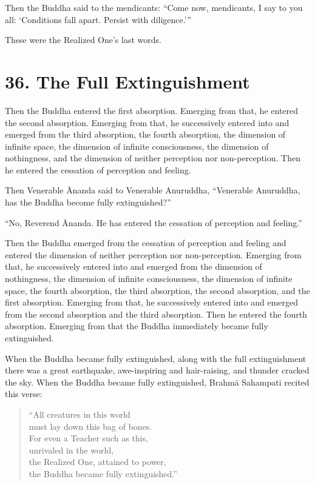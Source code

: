 \documentclass[12pt,openany]{book}%
\begin{document}
Then the Buddha said to the mendicants: “Come now, mendicants, I say to you all: ‘Conditions fall apart. Persist with diligence.’” 

These were the Realized One’s last words. 

\section*{36. The Full Extinguishment }

Then the Buddha entered the first absorption. Emerging from that, he entered the second absorption. Emerging from that, he successively entered into and emerged from the third absorption, the fourth absorption, the dimension of infinite space, the dimension of infinite consciousness, the dimension of nothingness, and the dimension of neither perception nor non-perception. Then he entered the cessation of perception and feeling. 

Then Venerable Ānanda said to Venerable Anuruddha, “Venerable Anuruddha, has the Buddha become fully extinguished?” 

“No, Reverend Ānanda. He has entered the cessation of perception and feeling.” 

Then the Buddha emerged from the cessation of perception and feeling and entered the dimension of neither perception nor non-perception. Emerging from that, he successively entered into and emerged from the dimension of nothingness, the dimension of infinite consciousness, the dimension of infinite space, the fourth absorption, the third absorption, the second absorption, and the first absorption. Emerging from that, he successively entered into and emerged from the second absorption and the third absorption. Then he entered the fourth absorption. Emerging from that the Buddha immediately became fully extinguished. 

When the Buddha became fully extinguished, along with the full extinguishment there was a great earthquake, awe-inspiring and hair-raising, and thunder cracked the sky. When the Buddha became fully extinguished, \textsanskrit{Brahmā} Sahampati recited this verse: 

\begin{verse}%
“All creatures in this world \\
must lay down this bag of bones. \\
For even a Teacher such as this, \\
unrivaled in the world, \\
the Realized One, attained to power, \\
the Buddha became fully extinguished.” 

%
\end{verse}
\end{document}
